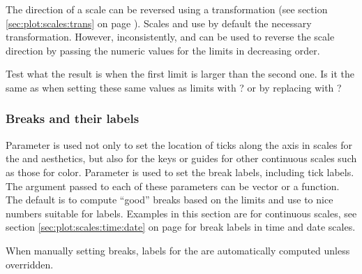 \documentclass[krantz2]{krantz}\usepackage{knitr}
\begin{document}
The direction of a scale can be reversed using a transformation (see section \ref{sec:plot:scales:trans} on page \pageref{sec:plot:scales:trans}). Scales  and  use by default the necessary transformation. However, inconsistently,  and  can be used to reverse the scale direction by passing the numeric values for the limits in decreasing order.

\begin{playground}
Test what the result is when the first limit is larger than the second one. Is it the same as when setting these same values as limits with ? or by replacing  with ?

\begin{knitrout}\footnotesize
{}\color{fgcolor}\begin{kframe}
\begin{alltt}
 \hlkwb{<-} \hlstd{(} \hlstd{=} \hlstd{(}\hlstd{,} \hlstd{))}
\end{alltt}
\end{kframe}
\end{knitrout}
\end{playground}

\subsubsection{Breaks and their labels}\label{sec:plot:scales:ticks}

Parameter  is used not only to set the location of ticks along the axis in scales for the  and  aesthetics, but also for the keys or guides for other continuous scales such as those for color. Parameter  is used to set the break labels, including tick labels. The argument passed to each of these parameters can be vector or a function. The default is to compute ``good'' breaks based on the limits and use to nice numbers suitable for labels. Examples in this section are for continuous scales, see section \ref{sec:plot:scales:time:date} on page \pageref{sec:plot:scales:time:date} for break labels in time and date scales.

When manually setting breaks, labels for the  are automatically computed unless overridden.
\end{document}

